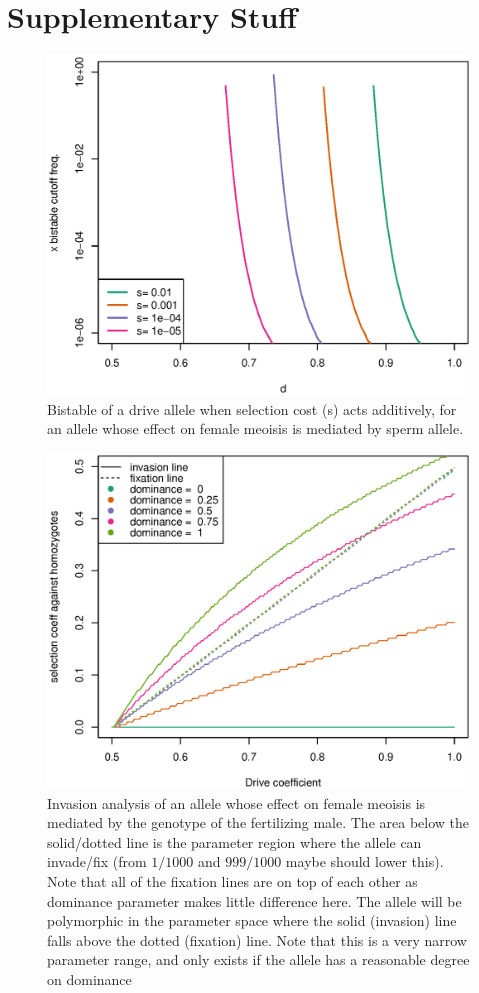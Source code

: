 \documentclass[12pt,letterpaper]{article}
\newcommand{\gc}[1]{{ \color{red} #1}}
\begin{document}
\section*{Supplementary Stuff}

\begin{figure}
\includegraphics[width = 0.8 \textwidth]{Figures/bistable_x_vs_d_additive_s.eps} 
\caption{Bistable of a drive allele when selection cost (s) acts
  additively, for an allele whose effect
 on female meoisis is mediated by sperm allele. }  \label{bistable_additive}
\end{figure}

\begin{figure}
\includegraphics[width = 0.8 \textwidth]{Figures/effect_of_dominance_on_invasion_space_one_graph.eps} 
\caption{Invasion analysis of an allele whose effect
 on female meoisis is mediated by the genotype of the fertilizing
 male. The area below the solid/dotted line is the parameter region
 where the allele can invade/fix (from $1/1000$ and $999/1000$
 \gc{maybe should lower this}). Note
 that all of the fixation lines are on top of each other as dominance
 parameter makes little difference here. The allele will be
 polymorphic in the parameter space where the solid (invasion) line
 falls above the dotted (fixation) line. Note that this is a very
 narrow parameter range, and only exists if the allele has a
 reasonable degree on dominance}  \label{Effect_of_dominance}
\end{figure}
\end{document}
